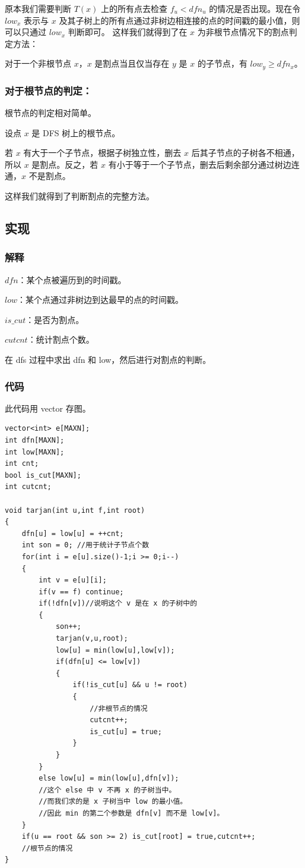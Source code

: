 \documentclass[11pt,oneside,a4paper,UTF8]{book}
\begin{document}
	原本我们需要判断 $T(x)$ 上的所有点去检查 $f_u < dfn_u$ 的情况是否出现。现在令 $low_x$ 表示与 $x$ 及其子树上的所有点通过非树边相连接的点的时间戳的最小值，则可以只通过 $low_x$ 判断即可。
	这样我们就得到了在 $x$ 为非根节点情况下的割点判定方法：\par
	
	{
		\kaishu
		对于一个非根节点 $x$，$x$ 是割点当且仅当存在 $y$ 是 $x$ 的子节点，有 $low_y \geq dfn_x$。
	}
	\subsubsection{对于根节点的判定：}
	根节点的判定相对简单。\par
	设点 $x$ 是 DFS 树上的根节点。\par
	若 $x$ 有大于一个子节点，根据子树独立性，删去 $x$ 后其子节点的子树各不相通，所以 $x$ 是割点。反之，若 $x$ 有小于等于一个子节点，删去后剩余部分通过树边连通，$x$ 不是割点。\par
	\par
	这样我们就得到了判断割点的完整方法。
	
	\subsection{实现}
	\subsubsection{解释}
	$dfn$：某个点被遍历到的时间戳。\par
	$low$：某个点通过非树边到达最早的点的时间戳。\par
	$is\_cut$：是否为割点。\par
	$cutcnt$：统计割点个数。\par
	在 dfs 过程中求出 dfn 和 low，然后进行对割点的判断。
	\subsubsection{代码}
	\noindent
	此代码用 vector 存图。
	\begin{lstlisting}
vector<int> e[MAXN];
int dfn[MAXN];
int low[MAXN];
int cnt;
bool is_cut[MAXN];
int cutcnt;

void tarjan(int u,int f,int root)
{
	dfn[u] = low[u] = ++cnt;
	int son = 0; //用于统计子节点个数
	for(int i = e[u].size()-1;i >= 0;i--)
	{
		int v = e[u][i];
		if(v == f) continue;
		if(!dfn[v])//说明这个 v 是在 x 的子树中的
		{
			son++;
			tarjan(v,u,root);
			low[u] = min(low[u],low[v]);
			if(dfn[u] <= low[v])
			{
				if(!is_cut[u] && u != root)
				{
					//非根节点的情况
					cutcnt++;
					is_cut[u] = true;
				}
			}
		}
		else low[u] = min(low[u],dfn[v]);
		//这个 else 中 v 不再 x 的子树当中。
		//而我们求的是 x 子树当中 low 的最小值。
		//因此 min 的第二个参数是 dfn[v] 而不是 low[v]。
	}
	if(u == root && son >= 2) is_cut[root] = true,cutcnt++;
	//根节点的情况
}
	\end{lstlisting}
	
\end{document}
